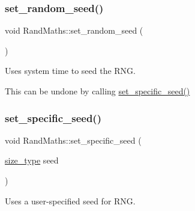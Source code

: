 \subsubsection{\texorpdfstring{set\+\_\+random\+\_\+seed()}{set\_random\_seed()}}
{\footnotesize\ttfamily void Rand\+Maths\+::set\+\_\+random\+\_\+seed (\begin{DoxyParamCaption}{ }\end{DoxyParamCaption})}



Uses system time to seed the R\+NG. 

This can be undone by calling {\ttfamily \mbox{\hyperlink{classrcombinator_1_1RandMaths_a0bf1c2e7a1eccb1f9246b3fceeb5db8a}{set\+\_\+specific\+\_\+seed()}}} \mbox{\label{classrcombinator_1_1RandMaths_a0bf1c2e7a1eccb1f9246b3fceeb5db8a}} 
\subsubsection{\texorpdfstring{set\+\_\+specific\+\_\+seed()}{set\_specific\_seed()}}
{\footnotesize\ttfamily void Rand\+Maths\+::set\+\_\+specific\+\_\+seed (\begin{DoxyParamCaption}\item[{\mbox{\hyperlink{constants_8h_abcd18a5521fc90ff6e7b00e4fee98397}{size\+\_\+type}}}]{seed }\end{DoxyParamCaption})}



Uses a user-\/specified seed for R\+NG. 


